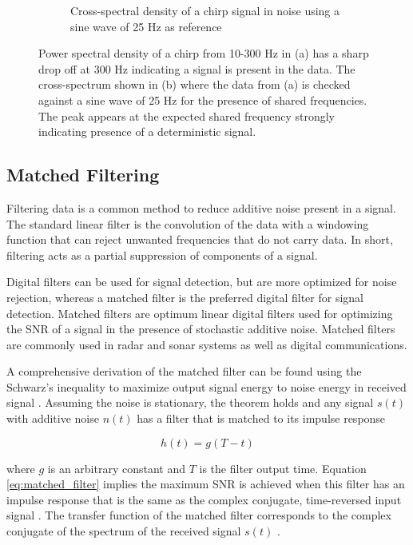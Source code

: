 \begin{figure} [h]
\begin{subfigure}[c]{0.49\textwidth}
                    \caption{Cross-spectral density of a chirp signal in noise using a sine wave of 25 Hz as reference}
                    \label{fig:CSD Example}
                \end{subfigure}
                \hfill
                \caption{Power spectral density of a chirp from 10-300 Hz in (a) has a sharp drop off at 300 Hz indicating a signal is present in the data. The cross-spectrum shown in (b) where the data from (a) is checked against a sine wave of 25 Hz for the presence of shared frequencies. The peak appears at the expected shared frequency strongly indicating presence of a deterministic signal.}
                \label{fig:CSD and PSD}
            \end{figure}

        \subsection{Matched Filtering}
            Filtering data is a common method to reduce additive noise present in a signal. The standard linear filter is the convolution of the data with a windowing function that can reject unwanted frequencies that do not carry data. In short, filtering acts as a partial suppression of components of a signal. 

            Digital filters can be used for signal detection, but are more optimized for noise rejection, whereas a matched filter is the preferred digital filter for signal detection. Matched filters are optimum linear digital filters used for optimizing the SNR of a signal in the presence of stochastic additive noise. Matched filters are commonly used in radar and sonar systems as well as digital communications.

            A comprehensive derivation of the matched filter can be found using the Schwarz's inequality to maximize output signal energy to noise energy in received signal \cite{ziemer_principles_2015}. Assuming the noise is stationary, the theorem holds and any signal $s(t)$ with additive noise $n(t)$ has a filter that is matched to its impulse response

            \begin{equation} \label{eq:matched_filter}
                h(t) = g(T - t)
            \end{equation}

            where $g$ is an arbitrary constant and $T$ is the filter output time. Equation \ref*{eq:matched_filter} implies the maximum SNR is achieved when this filter has an impulse response that is the same as the complex conjugate, time-reversed input signal \cite{bancroft_introduction_2002}. The transfer function of the matched filter corresponds to the complex conjugate of the spectrum of the received signal $s(t)$ \cite{turin_introduction_1960}. 

